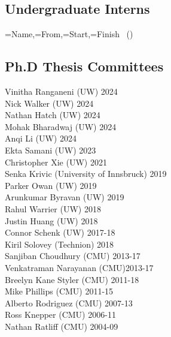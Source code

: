 \subsection{Undergraduate Interns}
\noindent
{}
{\name=Name,\from=From,\start=Start,\finish=Finish}
{\name~(\from) \hfill \DTLifnullorempty{\start}{}{\start-}\finish\\
}

\subsection{Ph.D Thesis Committees}
\noindent
Vinitha Ranganeni (UW) \hfill 2024\\
Nick Walker (UW) \hfill 2024\\
Nathan Hatch (UW) \hfill 2024\\
Mohak Bharadwaj (UW) \hfill 2024\\
Anqi Li (UW) \hfill 2024\\
Ekta Samani (UW) \hfill 2023\\
Christopher Xie (UW) \hfill 2021\\
Senka Krivic (University of Innsbruck) \hfill 2019\\
Parker Owan (UW) \hfill 2019\\
Arunkumar Byravan (UW) \hfill 2019\\
Rahul Warrier (UW) \hfill 2018\\
Justin Huang (UW) \hfill 2018\\
Connor Schenk (UW) \hfill 2017-18\\
Kiril Solovey (Technion) \hfill 2018\\
Sanjiban Choudhury (CMU) \hfill 2013-17\\
Venkatraman Narayanan (CMU)\hfill 2013-17\\
Breelyn Kane Styler (CMU) \hfill 2011-18\\ 
Mike Phillips (CMU) \hfill 2011-15\\
Alberto Rodriguez (CMU) \hfill 2007-13\\
Ross Knepper  (CMU) \hfill 2006-11\\
Nathan Ratliff (CMU) \hfill 2004-09\\
